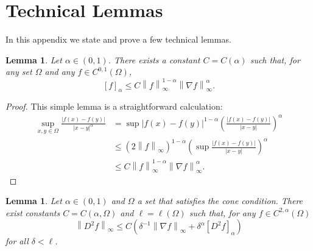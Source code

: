 \documentclass[11pt]{amsart}
\newtheorem{lemma}[theorem]{Lemma}
\theoremstyle{remark}
\theoremstyle{definition}
\newcommand{\norm}[1]{\left\lVert#1\right\rVert}
\newcommand{\paren}[1]{\left( #1 \right)}
\newcommand{\bracket}[1]{\left[ #1 \right]}
\newcommand{\grad}{\nabla}
\newcommand{\n}{^{-1}}
\begin{document}
\appendix
\section{Technical Lemmas} \label{sec:technical}

In this appendix we state and prove a few technical lemmas.  


\begin{lemma} \label{thm:interpolation C1 to holder}
Let $\alpha \in (0,1)$.  There exists a constant $C = C(\alpha)$ such that, for any set $\Omega$ and any $f \in C^{0,1}(\Omega)$,
\[ \bracket{f}_\alpha \leq C \norm{f}_\infty^{1-\alpha} \norm{\grad f}_\infty^\alpha. \]
\end{lemma}

\begin{proof}
This simple lemma is a straightforward calculation:
\begin{align*} 
\sup_{x,y \in \Omega} \frac{|f(x)-f(y)|}{|x-y|^\alpha} &= \sup |f(x)-f(y)|^{1-\alpha} \paren{\frac{|f(x)-f(y)|}{|x-y|}}^\alpha 
\\ &\leq \paren{2 \norm{f}_\infty}^{1-\alpha} \paren{ \sup \frac{|f(x)-f(y)|}{|x-y|} }^\alpha
\\ &\leq C \norm{f}_\infty^{1-\alpha} \norm{\grad f}_\infty^\alpha.
\end{align*}
\end{proof}

\begin{lemma} \label{thm:interpolation holder to C1}
Let $\alpha \in (0,1)$ and $\Omega$ a set that satisfies the cone condition.  There exist constants $C = C(\alpha, \Omega)$ and $\ell = \ell(\Omega)$ such that, for any $f \in C^{2,\alpha}(\Omega)$
\[ \norm{D^2 f}_\infty \leq C \paren{ \delta\n \norm{\grad f}_\infty  + \delta^\alpha \bracket{D^2 f}_\alpha }\]
for all $\delta < \ell$.  
\end{lemma}
\end{document}
